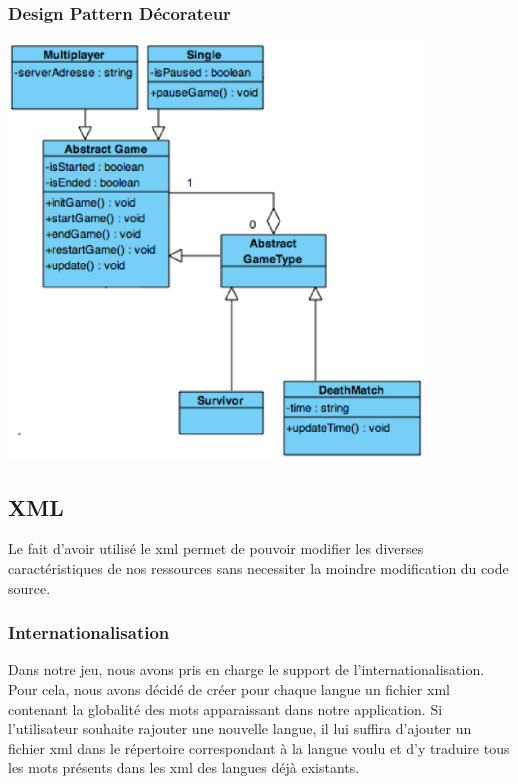 		\subsubsection{Design Pattern Décorateur}
		
			\begin{center}
				\includegraphics[width=11cm]{./Reutilisabilite/Img/decorateur.eps}
			\end{center} 
		
	\subsection{XML}
	
		Le fait d'avoir utilisé le \gls{xml} permet de pouvoir modifier les diverses caractéristiques de nos
		ressources sans necessiter la moindre modification du code source.
	
		\subsubsection{Internationalisation}
		
			Dans notre jeu, nous avons pris en charge le support de l'internationalisation.
			Pour cela, nous avons décidé de créer pour chaque langue un fichier
			\gls{xml} contenant la globalité des mots apparaissant dans notre application.
			Si l'utilisateur souhaite rajouter une nouvelle langue, il lui suffira d'ajouter
			un fichier \gls{xml} dans le répertoire correspondant à la langue voulu et d'y traduire
			tous les mots présents dans les \gls{xml} des langues déjà existants.
	
